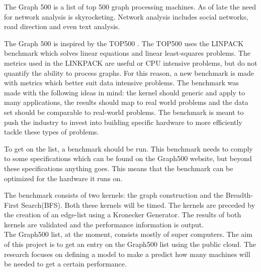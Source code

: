 The Graph 500 \cite{murphy2010introducing} is a list of top 500 graph processing machines. As of late the need for network analysis is skyrocketing. Network analysis includes social networks, road direction and even text analysis. 

The Graph 500 is inspired by the TOP500 \cite{top500}. The TOP500 uses the LINPACK benchmark which solves linear equations and linear least-squares problems. The metrics used in the LINKPACK are useful or CPU intensive problems, but do not quantify the ability to process graphs. For this reason, a new benchmark is made with metrics which better suit data intensive problems. The benchmark was made with the following ideas in mind: the kernel should generic and apply to many applications, the results should map to real world problems and the data set should be comparable to real-world problems. The benchmark is meant to push the industry to invest into building specific hardware to more efficiently tackle these types of problems.


To get on the list, a benchmark should be run. This benchmark needs to comply to some specifications which can be found on the Graph500 website\cite{graph500-specs}, but beyond these specifications anything goes. This means that the benchmark can be optimized for the hardware it runs on. 

The benchmark consists of two kernels: the graph construction and the Breadth-First Search(BFS). Both these kernels will be timed. The kernels are preceded by the creation of an edge-list using a Kronecker Generator\cite{leskovec2010kronecker}. The results of both kernels are validated and the performance information is output.
\\
The Graph500 list, at the moment, consists mostly of super computers. The aim of this project is to get an entry on the Graph500 list using the public cloud. The research focuses on defining a model to make a predict how many machines will be needed to get a certain performance.



